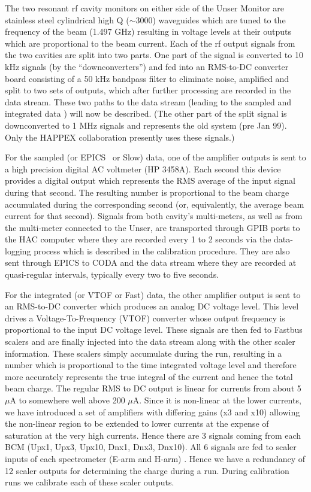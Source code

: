 {The two resonant rf cavity monitors on either side of the Unser
Monitor are stainless steel cylindrical high Q ($\sim 3000$)
waveguides which are tuned to the frequency of the beam (1.497 GHz)
resulting in voltage levels at their outputs which are proportional to
the beam current. Each of the rf output signals from the two cavities
are split into two parts. One part of the signal is converted to 10
kHz signals (by the ``downconverters'') and fed into an RMS-to-DC
converter board consisting of a 50 kHz bandpass filter to eliminate
noise, amplified and split to two sets of outputs, which after further
processing are recorded in the data stream. These two paths to the
data stream (leading to the sampled and integrated data ) will now be
described. (The other part of the split signal is downconverted to 1
MHz signals and represents the old system (pre Jan 99). Only the
HAPPEX collaboration presently uses these signals.)

For the sampled (or EPICS~\cite{EPICSwww} or Slow) data, one of the
amplifier outputs is sent to a high precision digital AC voltmeter (HP
3458A). Each second this device provides a digital output which
represents the RMS average of the input signal during that second.
The resulting number is proportional to the beam charge accumulated
during the corresponding second (or, equivalently, the average beam
current for that second). Signals from both cavity's multi-meters, as
well as from the multi-meter connected to the Unser, are transported
through GPIB ports to the HAC computer where they are recorded every 1
to 2 seconds via the data-logging process which is described in the
calibration procedure. They are also sent through EPICS to CODA and
the data stream where they are recorded at quasi-regular intervals,
typically every two to five seconds.

For the integrated (or VTOF or Fast) data, the other amplifier output
is sent to an RMS-to-DC converter which produces an analog DC voltage
level. This level drives a Voltage-To-Frequency (VTOF) converter whose
output frequency is proportional to the input DC voltage level. These
signals are then fed to Fastbus scalers and are finally injected into
the data stream along with the other scaler information.  These
scalers simply accumulate during the run, resulting in a number which
is proportional to the time integrated voltage level and therefore
more accurately represents the true integral of the current and hence
the total beam charge. The regular RMS to DC output is linear for
currents from about 5 $\mu$A to somewhere well above 200 $\mu$A.
Since it is non-linear at the lower currents, we have introduced a set
of amplifiers with differing gains (x3 and x10) allowing the
non-linear region to be extended to lower currents at the expense of
saturation at the very high currents. Hence there are 3 signals coming
from each BCM (Upx1, Upx3, Upx10, Dnx1, Dnx3, Dnx10). All 6 signals
are fed to scaler inputs of each spectrometer (E-arm and H-arm)
. Hence we have a redundancy of 12 scaler outputs for determining the
charge during a run. During calibration runs we calibrate each of
these scaler outputs.

}
